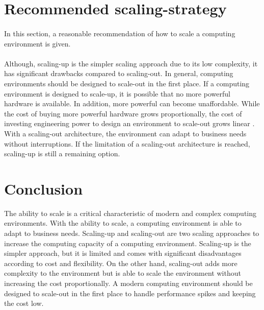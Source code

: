 \documentclass{article}
\begin{document}
\section{Recommended scaling-strategy}
\paragraph{}
In this section, a reasonable recommendation of how to scale a computing environment is given.


\paragraph{}
Although, scaling-up is the simpler scaling approach due to its low complexity, it has significant drawbacks compared to scaling-out. In general, computing environments should be designed to scale-out in the first place. 
If a computing environment is designed to scale-up, it is possible that no more powerful hardware is available. In addition, more powerful can become unaffordable.
While the cost of buying more powerful hardware grows proportionally, the cost of investing engineering power to design an environment to scale-out grows linear \cite{Abbot2011ScalabilityRules}. 
With a scaling-out architecture, the environment can adapt to business needs without interruptions. If the limitation of a scaling-out architecture is reached, scaling-up is still a remaining option.


\section{Conclusion}
The ability to scale is a critical characteristic of modern and complex computing environments. With the ability to scale, a computing environment is able to adapt to business needs. Scaling-up and scaling-out are two scaling approaches to increase the computing capacity of a computing environment. Scaling-up is the simpler approach, but it is limited and comes with significant disadvantages according to cost and flexibility. On the other hand, scaling-out adds more complexity to the environment but is able to scale the environment without increasing the cost proportionally. A modern computing environment should be designed to scale-out in the first place to handle performance spikes and keeping the cost low.


\pagebreak


\end{document}

